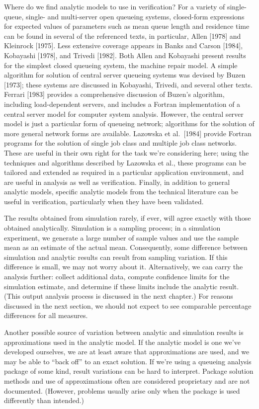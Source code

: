 Where do we find analytic models to use in verification? For a variety of
single-queue, single- and multi-server open queueing systems, closed-form
expressions for expected values of parameters such as mean queue length and
residence time can be found in several of the referenced texts, in particular,
Allen [1978] and Kleinrock [1975]. Less extensive coverage appears in Banks
and Carson [1984], Kobayashi [1978], and Trivedi [1982]. Both Allen and
Kobayashi present results for the simplest closed queueing system, the machine
repair model. A simple algorithm for solution of central server queueing
systems was devised by Buzen [1973]; these systems are discussed in Kobayashi,
Trivedi, and several other texts. Ferrari [1983] provides a comprehensive
discussion of Buzen's algorithm, including load-dependent servers, and
includes a Fortran implementation of a central server model for computer
system analysis. However, the central server model is just a particular form
of queueing network; algorithms for the solution of more general network forms
are available. Lazowska et al.\ [1984] provide Fortran programs for the
solution of single job class and multiple job class networks. These are useful
in their own right for the task we're considering here; using the techniques
and algorithms described by Lazowska et al., these programs can be tailored
and extended as required in a particular application environment, and are
useful in analysis as well as verification. Finally, in addition to general
analytic models, specific analytic models from the technical literature can be
useful in verification, particularly when they have been validated.

The results obtained from simulation rarely, if ever, will agree exactly with
those obtained analytically. Simulation is a sampling process; in a simulation
experiment, we generate a large number of sample values and use the sample
mean as an estimate of the actual mean. Consequently, some difference between
simulation and analytic results can result from sampling variation. If this
 difference is small, we may not worry about it. Alternatively, we can carry
the analysis further: collect additional data, compute confidence limits for
the simulation estimate, and determine if these limits include the analytic
result. (This output analysis process is discussed in the next chapter.) For
reasons discussed in the next section, we should not expect to see comparable
percentage differences for all measures.

Another possible source of variation between analytic and simulation results is
approximations used in the analytic model. If the analytic model is one we've
developed ourselves, we are at least aware that approximations are used, and we
may be able to ``back off'' to an exact solution. If we're using a queueing
analysis package of some kind, result variations can be hard to interpret.
Package solution methods and use of approximations often are considered
proprietary and are not documented. (However, problems usually arise only when
the package is used differently than intended.)

